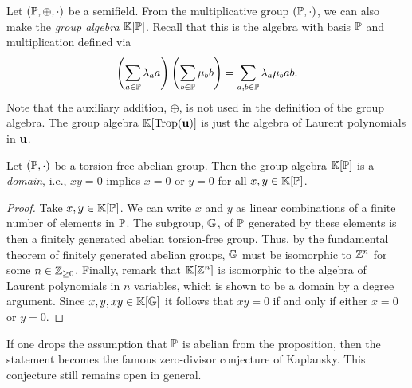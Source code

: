 Let $(\mathbb{P}, \oplus, \cdot)$ be a semifield. From the multiplicative group $(\mathbb{P},
	\cdot)$, we can also make the \emph{group algebra} $\mathbb{K}[\mathbb{P}]$.
Recall that this is the algebra with basis $\mathbb{P}$ and multiplication defined via
\begin{equation*}
	\left(\sum_{a \in \mathbb{P}} \lambda_a a\right)\left(\sum_{b \in \mathbb{P}}\mu_b b\right) = \sum_{a,b \in \mathbb{P}} \lambda_a \mu_b ab.
\end{equation*}
%
Note that the auxiliary addition, $\oplus$, is not used in the definition of the group
algebra. The group algebra $\mathbb{K}[\operatorname{Trop}(\mathbf{u})]$ is just the algebra of Laurent
polynomials in $\mathbf{u}$.
\begin{proposition}

	Let $(\mathbb{P}, \cdot)$ be a torsion-free abelian group. Then the group algebra
	$\mathbb{K}[\mathbb{P}]$ is a \emph{domain}, i.e., $x y = 0$ implies $x = 0$ or $y =
		0$ for all $x,y \in \mathbb{K}[\mathbb{P}]$.
\end{proposition}
\begin{proof}

	Take $x,y \in \mathbb{K}[\mathbb{P}]$. We can write $x$ and $y$ as linear combinations of a finite
	number of elements in $\mathbb{P}$. The subgroup, $\mathbb{G}$, of $\mathbb{P}$ generated by these
	elements is then a finitely generated abelian torsion-free group. Thus, by the
	fundamental theorem of finitely generated abelian groups, $\mathbb{G}$ must be isomorphic to
	$\mathbb{Z}^n$ for some $n \in \mathbb{Z}_{\geq 0}$. Finally, remark that $\mathbb{K}[\mathbb{Z}^n]$ is
	isomorphic to the algebra of Laurent polynomials in $n$ variables, which is shown to be
	a domain by a degree argument. Since $x,y,xy \in \mathbb{K}[\mathbb{G}]$ it follows that $xy = 0$
	if and only if either $x = 0$ or $y = 0$.
\end{proof}

\begin{remark}

	If one drops the assumption that $\mathbb{P}$ is abelian from the proposition, then the
	statement becomes the famous zero-divisor conjecture of Kaplansky. This conjecture still remains open in general.
\end{remark}

